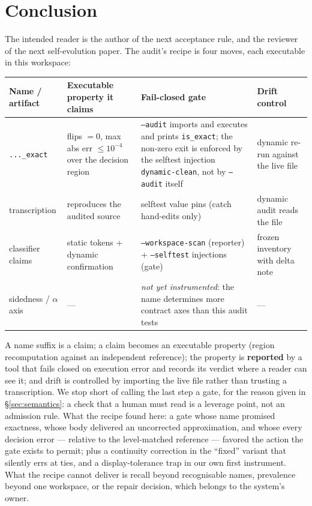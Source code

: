 \documentclass[10pt]{article}
\newcommand{\code}[1]{\texttt{#1}}
\begin{document}
\section{Conclusion}\label{sec:conclusion}

The intended reader is the author of the next acceptance rule, and the
reviewer of the next self-evolution paper. The audit's recipe is four moves,
each executable in this workspace:

\begin{center}
\footnotesize
\begin{tabular}{p{2.2cm}p{3.7cm}p{3.3cm}p{3.1cm}}
\toprule
Name / artifact & Executable property it claims & Fail-closed gate & Drift control \\
\midrule
\code{...\_exact} & flips $=0$, max abs err $\le 10^{-4}$ over the decision region & \code{--audit} imports and executes and prints \code{is\_exact}; the non-zero exit is enforced by the selftest injection \code{dynamic-clean}, not by \code{--audit} itself & dynamic re-run against the live file \\
transcription & reproduces the audited source & selftest value pins (catch hand-edits only) & dynamic audit reads the file \\
classifier claims & static tokens + dynamic confirmation & \code{--workspace-scan} (reporter) + \code{--selftest} injections (gate) & frozen inventory with delta note \\
sidedness / $\alpha$ axis & --- & \emph{not yet instrumented}: the name determines more contract axes than this audit tests & --- \\
\bottomrule
\end{tabular}
\end{center}

\noindent A name suffix is a claim; a claim becomes an executable property
(region recomputation against an independent reference); the property is
\textbf{reported} by a tool that fails closed on execution error and records
its verdict where a reader can see it; and drift is controlled by importing
the live file rather than trusting a transcription. We stop short of calling
the last step a gate, for the reason given in \S\ref{sec:semantics}: a check
that a human must read is a leverage point, not an admission rule. What the
recipe found here: a gate whose name promised exactness, whose body delivered
an uncorrected approximation, and whose every decision error --- relative to
the level-matched reference --- favored the action the gate exists to permit;
plus a continuity correction in the ``fixed'' variant that silently errs at
ties, and a display-tolerance trap in our own first instrument. What the
recipe cannot deliver is recall beyond recognisable names, prevalence beyond
one workspace, or the repair decision, which belongs to the system's owner.
\end{document}
